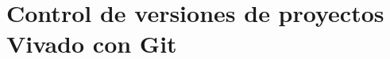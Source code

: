 \documentclass[11pt,letterpaper,oneside]{phstylee}
\begin{document}
\chapter{Control de versiones de proyectos Vivado con Git}
\label{cap:git}








\end{document}
